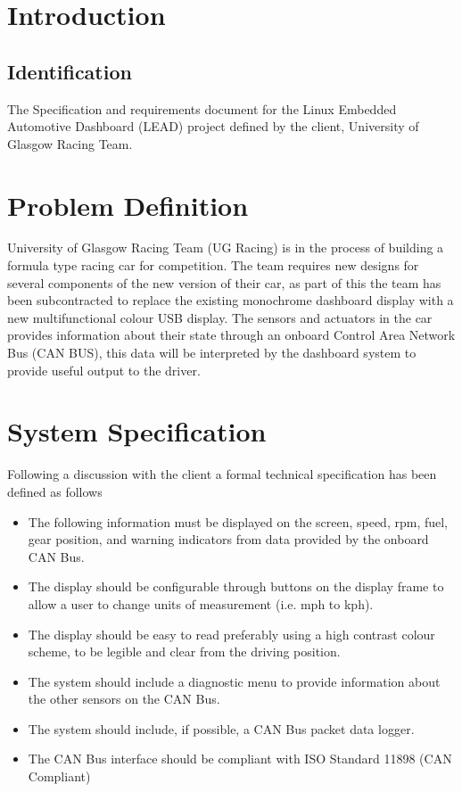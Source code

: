 \documentclass[11pt,a4wide]{article}
\begin{document}
\section{Introduction}
\subsection{Identification}
\indent The Specification and requirements document for the Linux Embedded Automotive Dashboard (LEAD) project defined by the client, University of Glasgow Racing Team. 

\section{Problem Definition}
University of Glasgow Racing Team (UG Racing) is in the process of building a formula type racing car for competition. The team requires new designs for several components of the new version of their car, as part of this the team has been subcontracted to replace the existing monochrome dashboard display with a new multifunctional colour USB display. The sensors and actuators in the car provides information about their state through an onboard Control Area Network Bus (CAN BUS), this data will be interpreted by the dashboard system to provide useful output to the driver.

\section{System Specification}
Following a discussion with the client a formal technical specification has been defined as follows
\begin{itemize}
	\item The following information must be displayed on the screen, speed, rpm, fuel, gear position, and warning indicators from data provided by the onboard CAN Bus.
	\item The display should be configurable through buttons on the display frame to allow a user to change units of measurement (i.e. mph to kph).
	\item The display should be easy to read preferably using a high contrast colour scheme, to be legible and clear from the driving position.
	\item The system should include a diagnostic menu to provide information about the other sensors on the CAN Bus.
	\item The system should include, if possible, a CAN Bus packet data logger.
	\item The CAN Bus interface should be compliant with ISO Standard 11898 (CAN Compliant)
\end{itemize}
\end{document}
